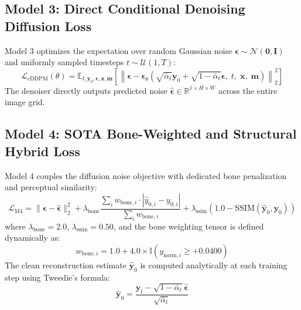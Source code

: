 \subsection{Model 3: Direct Conditional Denoising Diffusion Loss}
Model 3 optimizes the expectation over random Gaussian noise $\boldsymbol{\epsilon} \sim \mathcal{N}(\mathbf{0}, \mathbf{I})$ and uniformly sampled timesteps $t \sim \mathcal{U}(1, T)$:
\begin{equation}
\mathcal{L}_{\text{cDDPM}}(\theta) = \mathbb{E}_{t, \mathbf{y}_0, \boldsymbol{\epsilon}, \mathbf{x}, \mathbf{m}} \left[ \left\| \boldsymbol{\epsilon} - \boldsymbol{\epsilon}_\theta\left( \sqrt{\bar{\alpha}_t} \mathbf{y}_0 + \sqrt{1 - \bar{\alpha}_t} \boldsymbol{\epsilon}, \; t, \; \mathbf{x}, \; \mathbf{m} \right) \right\|_2^2 \right]
\label{eq:impl_m3_loss}
\end{equation}
The denoiser directly outputs predicted noise $\hat{\boldsymbol{\epsilon}} \in \mathbb{R}^{1 \times H \times W}$ across the entire image grid.

\subsection{Model 4: SOTA Bone-Weighted and Structural Hybrid Loss}
Model 4 couples the diffusion noise objective with dedicated bone penalization and perceptual similarity:
\begin{equation}
\mathcal{L}_{\text{M4}} = \|\boldsymbol{\epsilon} - \hat{\boldsymbol{\epsilon}}\|_2^2 + \lambda_{\text{bone}} \frac{\sum_i w_{\text{bone}, i} \cdot |\hat{y}_{0, i} - y_{0, i}|}{\sum_i w_{\text{bone}, i}} + \lambda_{\text{ssim}} (1.0 - \text{SSIM}(\mathbf{\hat{y}}_0, \mathbf{y}_0))
\label{eq:impl_m4_loss}
\end{equation}
where $\lambda_{\text{bone}} = 2.0$, $\lambda_{\text{ssim}} = 0.50$, and the bone weighting tensor is defined dynamically as:
\begin{equation}
w_{\text{bone}, i} = 1.0 + 4.0 \times \mathbb{I}\left( y_{\text{norm}, i} \ge +0.0400 \right)
\label{eq:bone_weight_def}
\end{equation}
The clean reconstruction estimate $\mathbf{\hat{y}}_0$ is computed analytically at each training step using Tweedie's formula:
\begin{equation}
\mathbf{\hat{y}}_0 = \frac{\mathbf{y}_t - \sqrt{1 - \bar{\alpha}_t}\hat{\boldsymbol{\epsilon}}}{\sqrt{\bar{\alpha}_t}}
\label{eq:tweedie_y0}
\end{equation}

